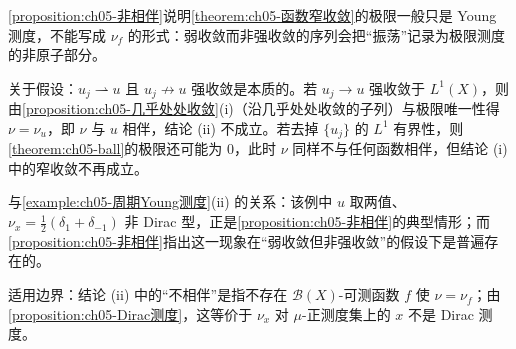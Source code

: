 \documentclass[../../main.tex]{subfiles}%
\begin{document}
\begin{remark}\label{remark:ch05-非相伴注}
\cref{proposition:ch05-非相伴}说明\cref{theorem:ch05-函数窄收敛}的极限一般只是 Young 测度，不能写成 $\nu_f$ 的形式：弱收敛而非强收敛的序列会把“振荡”记录为极限测度的非原子部分。

关于假设：$u_j\rightharpoonup u$ 且 $u_j\not\to u$ 强收敛是本质的。若 $u_j\to u$ 强收敛于 $L^1(X)$，则由\cref{proposition:ch05-几乎处处收敛}(i)（沿几乎处处收敛的子列）与极限唯一性得 $\nu=\nu_u$，即 $\nu$ 与 $u$ 相伴，结论 (ii) 不成立。若去掉 $\{u_j\}$ 的 $L^1$ 有界性，则\cref{theorem:ch05-ball}的极限还可能为 $0$，此时 $\nu$ 同样不与任何函数相伴，但结论 (i) 中的窄收敛不再成立。

与\cref{example:ch05-周期Young测度}(ii) 的关系：该例中 $u$ 取两值、$\nu_x=\frac12(\delta_1+\delta_{-1})$ 非 Dirac 型，正是\cref{proposition:ch05-非相伴}的典型情形；而\cref{proposition:ch05-非相伴}指出这一现象在“弱收敛但非强收敛”的假设下是普遍存在的。

适用边界：结论 (ii) 中的“不相伴”是指不存在 $\mathscr{B}(X)$-可测函数 $f$ 使 $\nu=\nu_f$；由\cref{proposition:ch05-Dirac测度}，这等价于 $\nu_x$ 对 $\mu$-正测度集上的 $x$ 不是 Dirac 测度。
\end{remark}
\end{document}
